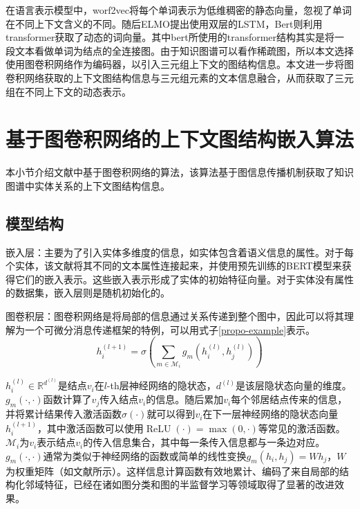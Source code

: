 在语言表示模型中，worf2vec将每个单词表示为低维稠密的静态向量，忽视了单词在不同上下文含义的不同。随后ELMO提出使用双层的LSTM，Bert则利用transformer获取了动态的词向量。其中bert所使用的transformer结构其实是将一段文本看做单词为结点的全连接图。由于知识图谱可以看作稀疏图，所以本文选择使用图卷积网络作为编码器，以引入三元组上下文的图结构信息。本文进一步将图卷积网络获取的上下文图结构信息与三元组元素的文本信息融合，从而获取了三元组在不同上下文的动态表示。



\section{基于图卷积网络的上下文图结构嵌入算法}\label{RGCN}
本小节介绍文献\parencite{schlichtkrull2018modeling}中基于图卷积网络的算法，该算法基于图信息传播机制获取了知识图谱中实体关系的上下文图结构信息。
\subsection{模型结构}
嵌入层：主要为了引入实体多维度的信息，如实体包含着语义信息的属性。对于每个实体，该文献将其不同的文本属性连接起来，并使用预先训练的BERT模型来获得它们的嵌入表示。这些嵌入表示形成了实体的初始特征向量。对于实体没有属性的数据集，嵌入层则是随机初始化的。

图卷积层：图卷积网络是将局部的信息通过关系传递到整个图中，因此可以将其理解为一个可微分消息传递框架的特例，可以用式子\ref{propo-example}表示。
\begin{equation}
    h_{i}^{(l+1)}=\sigma\left(\sum_{m \in \mathcal{M}_{i}} g_{m}\left(h_{i}^{(l)}, h_{j}^{(l)}\right)\right)
    \label{propo-example}
\end{equation}

$h_{i}^{(l)} \in \mathbb{R}^{d^{(l)}}$是结点$v_{i}$在$l$-th层神经网络的隐状态，$d^{(l)}$是该层隐状态向量的维度。$g_{m}(\cdot, \cdot)$函数计算了$v_{j}$传入结点$v_{i}$的信息。随后累加$v_{i}$每个邻居结点传来的信息，并将累计结果传入激活函数$\sigma(\cdot)$就可以得到$v_{i}$在下一层神经网络的隐状态向量$h_{i}^{(l+1)}$，其中激活函数可以使用$\operatorname{ReLU}(\cdot)=\max (0, \cdot)$等常见的激活函数。$\mathcal{M}_{i}$为$v_{i}$表示结点$v_{i}$的传入信息集合，其中每一条传入信息都与一条边对应。$g_{m}(\cdot, \cdot)$通常为类似于神经网络的函数或简单的线性变换$g_{m}\left(h_{i}, h_{j}\right)=W h_{j}$，$W$为权重矩阵（如文献\parencite{kipf2016semi}所示）。这样信息计算函数有效地累计、编码了来自局部的结构化邻域特征，已经在诸如图分类\parencite{duvenaud2015convolutional}和图的半监督学习等领域取得了显著的改进效果。

